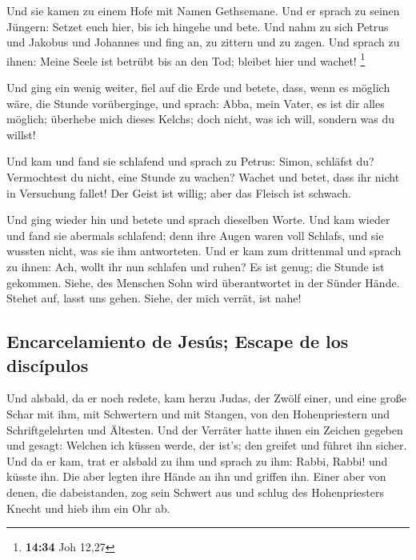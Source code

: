  Und sie kamen zu einem Hofe mit Namen Gethsemane. Und er
sprach zu seinen Jüngern: Setzet euch hier, bis ich hingehe und bete.
 Und nahm zu sich Petrus und Jakobus und Johannes und
fing an, zu zittern und zu zagen.  Und sprach zu ihnen:
Meine Seele ist betrübt bis an den Tod; bleibet hier und wachet!
\footnote{\textbf{14:34} Joh 12,27}

 Und ging ein wenig weiter, fiel auf die Erde und betete,
dass, wenn es möglich wäre, die Stunde vorüberginge,  und
sprach: Abba, mein Vater, es ist dir alles möglich; überhebe mich dieses
Kelchs; doch nicht, was ich will, sondern was du willst!

 Und kam und fand sie schlafend und sprach zu Petrus:
Simon, schläfst du? Vermochtest du nicht, eine Stunde zu wachen?
 Wachet und betet, dass ihr nicht in Versuchung fallet!
Der Geist ist willig; aber das Fleisch ist schwach.

 Und ging wieder hin und betete und sprach dieselben
Worte.  Und kam wieder und fand sie abermals schlafend;
denn ihre Augen waren voll Schlafs, und sie wussten nicht, was sie ihm
antworteten.  Und er kam zum drittenmal und sprach zu
ihnen: Ach, wollt ihr nun schlafen und ruhen? Es ist genug; die Stunde
ist gekommen. Siehe, des Menschen Sohn wird überantwortet in der Sünder
Hände.  Stehet auf, lasst uns gehen. Siehe, der mich
verrät, ist nahe!

\hypertarget{encarcelamiento-de-jesuxfas-escape-de-los-discuxedpulos}{%
\subsection{Encarcelamiento de Jesús; Escape de los
discípulos}\label{encarcelamiento-de-jesuxfas-escape-de-los-discuxedpulos}}

 Und alsbald, da er noch redete, kam herzu Judas, der
Zwölf einer, und eine große Schar mit ihm, mit Schwertern und mit
Stangen, von den Hohenpriestern und Schriftgelehrten und Ältesten.
 Und der Verräter hatte ihnen ein Zeichen gegeben und
gesagt: Welchen ich küssen werde, der ist's; den greifet und führet ihn
sicher.  Und da er kam, trat er alsbald zu ihm und sprach
zu ihm: Rabbi, Rabbi! und küsste ihn.  Die aber legten
ihre Hände an ihn und griffen ihn.  Einer aber von denen,
die dabeistanden, zog sein Schwert aus und schlug des Hohenpriesters
Knecht und hieb ihm ein Ohr ab.

